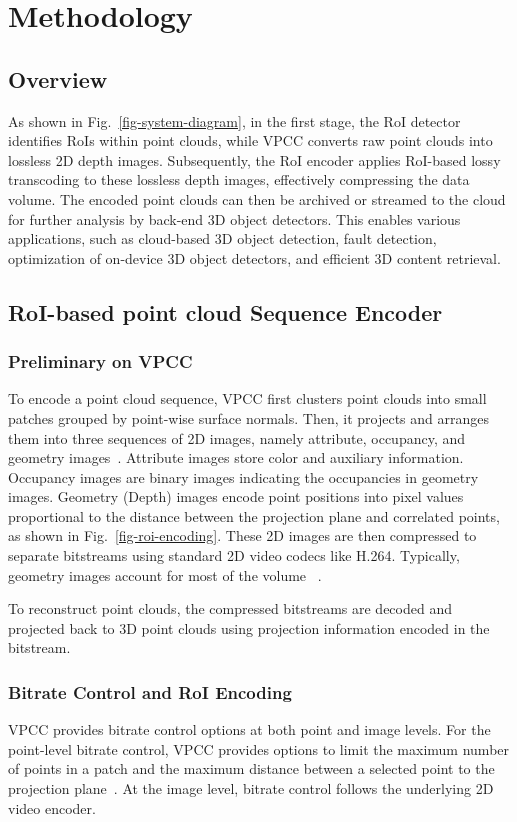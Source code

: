 \section{Methodology}
\subsection{Overview}
As shown in Fig.~\ref{fig-system-diagram}, in the first stage, the RoI detector identifies RoIs within point clouds, while VPCC converts raw point clouds into lossless 2D depth images. Subsequently, the RoI encoder applies RoI-based lossy transcoding to these lossless depth images, effectively compressing the data volume. The encoded point clouds can then be archived or streamed to the cloud for further analysis by back-end 3D object detectors. This enables various applications, such as cloud-based 3D object detection, fault detection, optimization of on-device 3D object detectors, and efficient 3D content retrieval.

\subsection{RoI-based point cloud Sequence Encoder}
\label{sec-roi-encoder}
\subsubsection{Preliminary on VPCC}
To encode a point cloud sequence, VPCC first clusters point clouds into small patches grouped by point-wise surface normals. Then, it projects and arranges them into three sequences of 2D images, namely attribute, occupancy, and geometry images~\cite{graziosiOverviewOngoingPoint2020}. 
Attribute images store color and auxiliary information. Occupancy images are binary images indicating the occupancies in geometry images.
Geometry (Depth) images encode point positions into pixel values proportional to the distance between the projection plane and correlated points, as shown in Fig.~\ref{fig-roi-encoding}.
These 2D images are then compressed to separate bitstreams using standard 2D video codecs like H.264. Typically, geometry images account for most of the volume ~\cite{rudolph2023rabbit}.

To reconstruct point clouds, the compressed bitstreams are decoded and projected back to 3D point clouds using projection information encoded in the bitstream.

\subsubsection{Bitrate Control and RoI Encoding}
VPCC provides bitrate control options at both point and image levels. For the point-level bitrate control, VPCC provides options to limit the maximum number of points in a patch and the maximum distance between a selected point to the projection plane~\cite{graziosiOverviewOngoingPoint2020}. At the image level, bitrate control follows the underlying 2D video encoder. 

